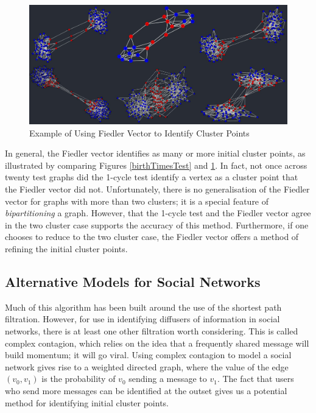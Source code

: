 \documentclass[12pt,a4paper]{amsart}
\numberwithin{equation}{section}
\theoremstyle{plain}
\theoremstyle{definition}
\begin{document}
\begin{figure}[h]
	\centering
	\includegraphics[scale=0.55]{FiedlerClusterPoints.jpg}
	\caption{Example of Using Fiedler Vector to Identify Cluster Points}
	\label{fiedlerTest}
\end{figure}

\newpage

In general, the Fiedler vector identifies as many or more initial cluster points, as illustrated by comparing Figures \ref{birthTimesTest} and \ref{fiedlerTest}. In fact, not once across twenty test graphs did the 1-cycle test identify a vertex as a cluster point that the Fiedler vector did not. Unfortunately, there is no generalisation of the Fiedler vector for graphs with more than two clusters; it is a special feature of \textit{bipartitioning} a graph. However, that the 1-cycle test and the Fiedler vector agree in the two cluster case supports the accuracy of this method. Furthermore, if one chooses to reduce to the two cluster case, the Fiedler vector offers a method of refining the initial cluster points.

\subsection{Alternative Models for Social Networks} Much of this algorithm has been built around the use of the shortest path filtration. However, for use in identifying diffusers of information in social networks, there is at least one other filtration worth considering. This is called complex contagion, which relies on the idea that a frequently shared message will build momentum; it will go viral. Using complex contagion to model a social network gives rise to a weighted directed graph, where the value of the edge $(v_0,v_1)$ is the probability of $v_0$ sending a message to $v_1$. The fact that users who send more messages can be identified at the outset gives us a potential method for identifying initial cluster points.
\end{document}
